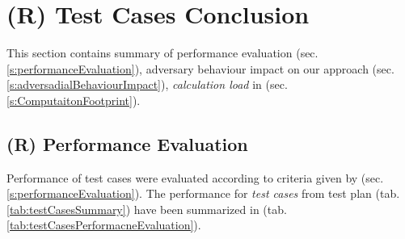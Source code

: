 \newpage
\section{(R) Test Cases Conclusion}\label{s:testCasesConclusion}
\noindent This section contains summary of performance evaluation (sec. \ref{s:performanceEvaluation}), adversary behaviour impact on our approach (sec. \ref{s:adversadialBehaviourImpact}), \emph{calculation load} in (sec. \ref{s:ComputaitonFootprint}).

\subsection{(R) Performance Evaluation}\label{s:performanceEvaluationTable}
\noindent Performance of test cases were evaluated according to criteria given by (sec. \ref{s:performanceEvaluation}). The performance for \emph{test cases} from test plan (tab. \ref{tab:testCasesSummary}) have been summarized in (tab. \ref{tab:testCasesPerformacneEvaluation}).

